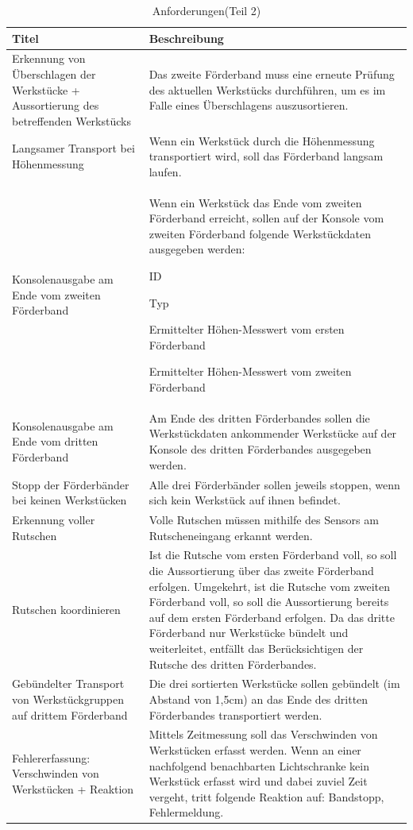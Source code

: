 \documentclass[a4paper, 11pt]{article}
\begin{document}
\newpage

\begin{table}[h]
\center
\begin{tabularx}{\textwidth}{|X|X|}
\hline
\textbf{Titel}&\textbf{Beschreibung}\\
\hline
Erkennung von Überschlagen der Werkstücke + Aussortierung des betreffenden Werkstücks&Das zweite Förderband muss eine erneute Prüfung des aktuellen Werkstücks durchführen, um es im Falle eines Überschlagens auszusortieren.\\
\hline
Langsamer Transport bei Höhenmessung&Wenn ein Werkstück durch die Höhenmessung transportiert wird, soll das Förderband langsam laufen.\\
\hline
Konsolenausgabe am Ende vom zweiten Förderband&Wenn ein Werkstück das Ende vom zweiten Förderband erreicht, sollen auf der Konsole vom zweiten Förderband folgende Werkstückdaten ausgegeben werden:
\begin{compactenum}[-]
\item ID 
\item Typ 
\item Ermittelter Höhen-Messwert vom ersten Förderband 
\item Ermittelter Höhen-Messwert vom zweiten Förderband 
\end{compactenum}\\
\hline
Konsolenausgabe am Ende vom dritten Förderband&Am Ende des dritten Förderbandes sollen die Werkstückdaten ankommender Werkstücke auf der Konsole des dritten Förderbandes ausgegeben werden.\\
\hline
Stopp der Förderbänder bei keinen Werkstücken&Alle drei Förderbänder sollen jeweils stoppen, wenn sich kein Werkstück auf ihnen befindet.\\
\hline
Erkennung voller Rutschen&Volle Rutschen müssen mithilfe des Sensors am Rutscheneingang erkannt werden.\\
\hline
Rutschen koordinieren&Ist die Rutsche vom ersten Förderband voll, so soll die Aussortierung über das zweite Förderband erfolgen. Umgekehrt, ist die Rutsche vom zweiten Förderband voll, so soll die Aussortierung bereits auf dem ersten Förderband erfolgen. Da das dritte Förderband nur Werkstücke bündelt und weiterleitet, entfällt das Berücksichtigen der Rutsche des dritten Förderbandes.\\
\hline
Gebündelter Transport von Werkstückgruppen auf drittem Förderband&Die drei sortierten Werkstücke sollen gebündelt (im Abstand von 1,5cm) an das Ende des dritten Förderbandes transportiert werden.\\
\hline
Fehlererfassung: Verschwinden von Werkstücken + Reaktion&Mittels Zeitmessung soll das Verschwinden von Werkstücken erfasst werden. Wenn an einer nachfolgend benachbarten Lichtschranke kein Werkstück erfasst wird und dabei zuviel Zeit vergeht, tritt folgende Reaktion auf: Bandstopp, Fehlermeldung.\\
\hline
\end{tabularx}
\caption{Anforderungen(Teil 2)}
\label{anf2}
\end{table}
\end{document}
